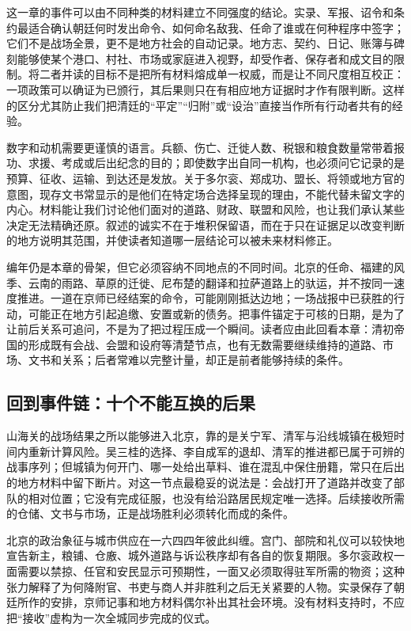 这一章的事件可以由不同种类的材料建立不同强度的结论。实录、军报、诏令和条约最适合确认朝廷何时发出命令、如何命名敌我、任命了谁或在何种程序中签字；它们不是战场全景，更不是地方社会的自动记录。地方志、契约、日记、账簿与碑刻能够使某个港口、村社、市场或家庭进入视野，却受作者、保存者和成文目的限制。将二者并读的目标不是把所有材料熔成单一权威，而是让不同尺度相互校正：一项政策可以确证为已颁行，其后果则只在有相应地方证据时才作有限判断。这样的区分尤其防止我们把清廷的“平定”“归附”或“设治”直接当作所有行动者共有的经验。

数字和动机需要更谨慎的语言。兵额、伤亡、迁徙人数、税银和粮食数量常带着报功、求援、考成或后出纪念的目的；即使数字出自同一机构，也必须问它记录的是预算、征收、运输、到达还是发放。关于多尔衮、郑成功、盟长、将领或地方官的意图，现存文书常显示的是他们在特定场合选择呈现的理由，不能代替未留文字的内心。材料能让我们讨论他们面对的道路、财政、联盟和风险，也让我们承认某些决定无法精确还原。叙述的诚实不在于堆积保留语，而在于只在证据足以改变判断的地方说明其范围，并使读者知道哪一层结论可以被未来材料修正。

编年仍是本章的骨架，但它必须容纳不同地点的不同时间。北京的任命、福建的风季、云南的雨路、草原的迁徙、尼布楚的翻译和拉萨道路上的驮运，并不按同一速度推进。一道在京师已经结案的命令，可能刚刚抵达边地；一场战报中已获胜的行动，可能正在地方引起追缴、安置或新的债务。把事件锚定于可核的日期，是为了让前后关系可追问，不是为了把过程压成一个瞬间。读者应由此回看本章：清初帝国的形成既有会战、会盟和设府等清楚节点，也有无数需要继续维持的道路、市场、文书和关系；后者常难以完整计量，却正是前者能够持续的条件。



\subsection*{回到事件链：十个不能互换的后果}

山海关的战场结果之所以能够进入北京，靠的是关宁军、清军与沿线城镇在极短时间内重新计算风险。吴三桂的选择、李自成军的退却、清军的推进都已属于可辨的战事序列；但城镇为何开门、哪一处给出草料、谁在混乱中保住册籍，常只在后出的地方材料中留下断片。对这一节点最稳妥的说法是：会战打开了道路并改变了部队的相对位置；它没有完成征服，也没有给沿路居民规定唯一选择。后续接收所需的仓储、文书与市场，正是战场胜利必须转化而成的条件。

北京的政治象征与城市供应在一六四四年彼此纠缠。宫门、部院和礼仪可以较快地宣告新主，粮铺、仓廒、城外道路与诉讼秩序却有各自的恢复期限。多尔衮政权一面需要以禁掠、任官和安民显示可预期性，一面又必须取得驻军所需的物资；这种张力解释了为何降附官、书吏与商人并非胜利之后无关紧要的人物。实录保存了朝廷所作的安排，京师记事和地方材料偶尔补出其社会环境。没有材料支持时，不应把“接收”虚构为一次全城同步完成的仪式。

